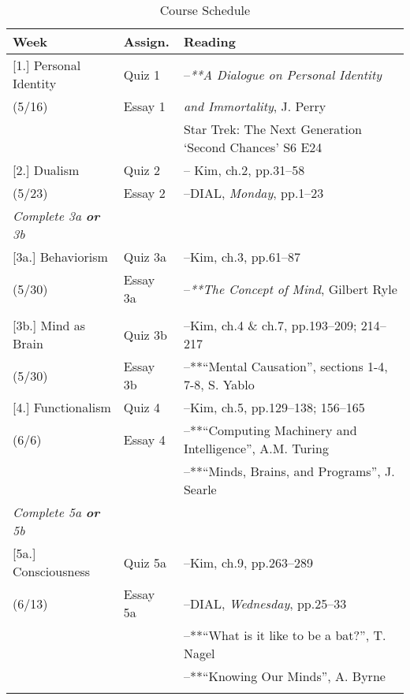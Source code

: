 \documentclass[article,oneside]{memoir}
\begin{document}
\begin{center}
\begin{longtable}{p{4.5cm}p{1.5cm}p{6.5cm}}
 
  \caption{Course Schedule} \\
  \toprule
  \textbf{Week} &\textbf{Assign.} & \textbf{Reading} \\
  \midrule

[1.] Personal Identity			& Quiz 1		& --\emph{**A Dialogue on Personal Identity } \\
(5/16)				        	& Essay 1		& \emph{and Immortality}, J. Perry  \\ 
						&			& Star Trek: The Next Generation `Second Chances' S6 E24 \\ [.5\baselineskip] \midrule
	
[2.] Dualism			      	& Quiz 2		& -- Kim, ch.2, pp.31--58\\
(5/23)					 & Essay 2		& --DIAL, \emph{Monday}, pp.1--23  \\   
 [1\baselineskip] \midrule

\emph{Complete 3a \textbf{or} 3b}	& 		& 	\\ [.5\baselineskip]

[3a.] Behaviorism		    	& Quiz 3a	   	& --Kim, ch.3, pp.61--87 \\
(5/30)			        			& Essay 3a	&  --\emph{**The Concept of Mind}, Gilbert Ryle\\   
			        			& 	& \\   
  
[3b.] Mind as Brain 		   	& Quiz 3b	   	& --Kim, ch.4 \& ch.7, pp.193--209; 214--217\\
(5/30)					         & Essay 3b	& --**``Mental Causation'', sections 1-4, 7-8, S. Yablo  \\  [.5\baselineskip]   \midrule



[4.] Functionalism			& Quiz 4		& --Kim, ch.5, pp.129--138; 156--165\\
(6/6)		            			& Essay 4		& --**``Computing Machinery and Intelligence'', A.M. Turing  \\  
						&			& --**``Minds, Brains, and Programs'', J.  Searle \\ [.5\baselineskip] \midrule
		
\emph{Complete 5a \textbf{or} 5b}	& 		& 	\\ [.5\baselineskip]

		
[5a.] Consciousness 		& Quiz 5a		& --Kim, ch.9, pp.263--289 \\
(6/13)				      	& Essay 5a		& --DIAL, \emph{Wednesday}, pp.25--33 \\
						& 			& --**``What is it like to be a bat?'', T. Nagel \\ 
						&			& --**``Knowing Our Minds'', A. Byrne \\ [.5\baselineskip] 
 			        			& 	& \\   


\end{longtable}
\end{center}
\end{document}
